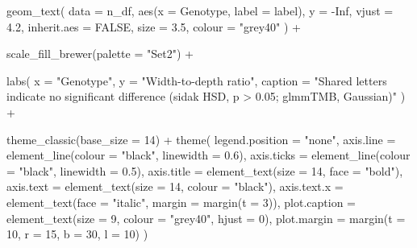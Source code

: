 \documentclass[
  letterpaper,
  DIV=11,
  numbers=noendperiod]{scrartcl}
\newenvironment{Shaded}{\begin{snugshade}}{\end{snugshade}}
\newcommand{\AttributeTok}[1]{\textcolor[rgb]{0.40,0.45,0.13}{#1}}
\newcommand{\ConstantTok}[1]{\textcolor[rgb]{0.56,0.35,0.01}{#1}}
\newcommand{\DecValTok}[1]{\textcolor[rgb]{0.68,0.00,0.00}{#1}}
\newcommand{\FloatTok}[1]{\textcolor[rgb]{0.68,0.00,0.00}{#1}}
\newcommand{\FunctionTok}[1]{\textcolor[rgb]{0.28,0.35,0.67}{#1}}
\newcommand{\NormalTok}[1]{\textcolor[rgb]{0.00,0.23,0.31}{#1}}
\newcommand{\SpecialCharTok}[1]{\textcolor[rgb]{0.37,0.37,0.37}{#1}}
\newcommand{\StringTok}[1]{\textcolor[rgb]{0.13,0.47,0.30}{#1}}
\newcounter{none} %
\begin{document}
\begin{Shaded}
\begin{Highlighting}[]
  \FunctionTok{geom\_text}\NormalTok{(}
    \AttributeTok{data        =}\NormalTok{ n\_df,}
    \FunctionTok{aes}\NormalTok{(}\AttributeTok{x =}\NormalTok{ Genotype, }\AttributeTok{label =}\NormalTok{ label),}
    \AttributeTok{y           =} \SpecialCharTok{{-}}\ConstantTok{Inf}\NormalTok{,}
    \AttributeTok{vjust       =} \FloatTok{4.2}\NormalTok{,}
    \AttributeTok{inherit.aes =} \ConstantTok{FALSE}\NormalTok{,}
    \AttributeTok{size        =} \FloatTok{3.5}\NormalTok{,}
    \AttributeTok{colour      =} \StringTok{"grey40"}
\NormalTok{  ) }\SpecialCharTok{+}

  \FunctionTok{scale\_fill\_brewer}\NormalTok{(}\AttributeTok{palette =} \StringTok{"Set2"}\NormalTok{) }\SpecialCharTok{+}

  \FunctionTok{labs}\NormalTok{(}
    \AttributeTok{x       =} \StringTok{"Genotype"}\NormalTok{,}
    \AttributeTok{y       =} \StringTok{"Width{-}to{-}depth ratio"}\NormalTok{,}
    \AttributeTok{caption =} \StringTok{"Shared letters indicate no significant difference (sidak HSD, p \textgreater{} 0.05; glmmTMB, Gaussian)"}
\NormalTok{  ) }\SpecialCharTok{+}

  \FunctionTok{theme\_classic}\NormalTok{(}\AttributeTok{base\_size =} \DecValTok{14}\NormalTok{) }\SpecialCharTok{+}
  \FunctionTok{theme}\NormalTok{(}
    \AttributeTok{legend.position =} \StringTok{"none"}\NormalTok{,}
    \AttributeTok{axis.line       =} \FunctionTok{element\_line}\NormalTok{(}\AttributeTok{colour =} \StringTok{"black"}\NormalTok{, }\AttributeTok{linewidth =} \FloatTok{0.6}\NormalTok{),}
    \AttributeTok{axis.ticks      =} \FunctionTok{element\_line}\NormalTok{(}\AttributeTok{colour =} \StringTok{"black"}\NormalTok{, }\AttributeTok{linewidth =} \FloatTok{0.5}\NormalTok{),}
    \AttributeTok{axis.title      =} \FunctionTok{element\_text}\NormalTok{(}\AttributeTok{size =} \DecValTok{14}\NormalTok{, }\AttributeTok{face =} \StringTok{"bold"}\NormalTok{),}
    \AttributeTok{axis.text       =} \FunctionTok{element\_text}\NormalTok{(}\AttributeTok{size =} \DecValTok{14}\NormalTok{, }\AttributeTok{colour =} \StringTok{"black"}\NormalTok{),}
    \AttributeTok{axis.text.x     =} \FunctionTok{element\_text}\NormalTok{(}\AttributeTok{face =} \StringTok{"italic"}\NormalTok{, }\AttributeTok{margin =} \FunctionTok{margin}\NormalTok{(}\AttributeTok{t =} \DecValTok{3}\NormalTok{)),}
    \AttributeTok{plot.caption    =} \FunctionTok{element\_text}\NormalTok{(}\AttributeTok{size =} \DecValTok{9}\NormalTok{, }\AttributeTok{colour =} \StringTok{"grey40"}\NormalTok{, }\AttributeTok{hjust =} \DecValTok{0}\NormalTok{),}
    \AttributeTok{plot.margin     =} \FunctionTok{margin}\NormalTok{(}\AttributeTok{t =} \DecValTok{10}\NormalTok{, }\AttributeTok{r =} \DecValTok{15}\NormalTok{, }\AttributeTok{b =} \DecValTok{30}\NormalTok{, }\AttributeTok{l =} \DecValTok{10}\NormalTok{)}
\NormalTok{  )}


\end{Highlighting}
\end{Shaded}
\end{document}
